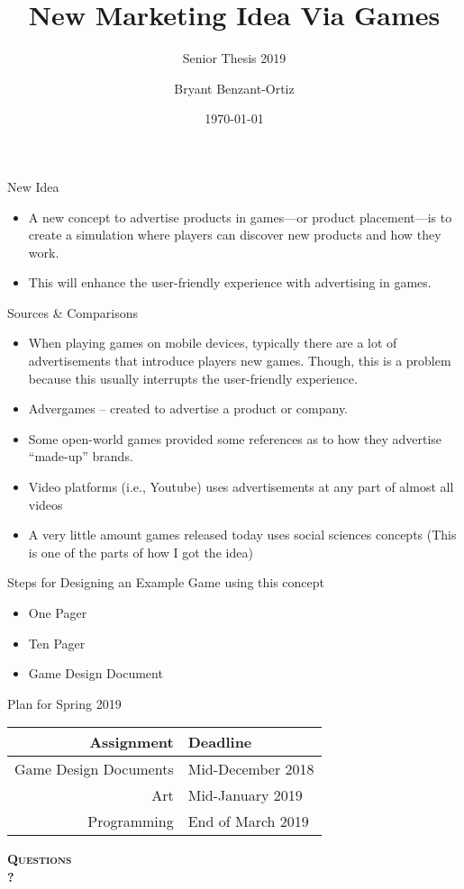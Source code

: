 \documentclass[12pt]{beamer}
\title{New Marketing Idea Via Games}
\subtitle{Senior Thesis 2019}
\author{Bryant Benzant-Ortiz}
\date{\today}
\begin{document}
\begin{frame}
  \titlepage
\end{frame}

\begin{frame}{New Idea}
	\begin{itemize}
		\item A new concept to advertise products in games---or product placement---is to create a simulation where players can discover new products and how they work.
		\item This will enhance the user-friendly experience with advertising in games.
	\end{itemize}
\end{frame}

\begin{frame}{Sources \& Comparisons}
	\begin{itemize}
		\item When playing games on mobile devices, typically there are a lot of advertisements that introduce players new games. Though, this is a problem because this usually interrupts the user-friendly experience.
		\item Advergames -- created to advertise a product or company.
		\item Some open-world games provided some references as to how they advertise ``made-up'' brands.
		\item Video platforms (i.e., Youtube) uses advertisements at any part of almost all videos
		\item A very little amount games released today uses social sciences concepts (This is one of the parts of how I got the idea)
	\end{itemize}
\end{frame}

\begin{frame}{Steps for Designing an Example Game using this concept}
	\begin{itemize}
		\item One Pager
		\item Ten Pager
		\item Game Design Document
	\end{itemize}
\end{frame}

\begin{frame}{Plan for Spring 2019}
\begin{center}
\begin{tabular}{r|l}
\textbf{Assignment} & \textbf{Deadline} \\ \hline
Game Design Documents & Mid-December 2018 \\
Art & Mid-January 2019 \\
Programming & End of March 2019
\end{tabular}
\end{center}
\end{frame}

\begin{frame}
\begin{center}
{\Huge \textsc{\textbf{Questions}} \\ \textbf{?}}
\end{center}
\end{frame}
\end{document}
